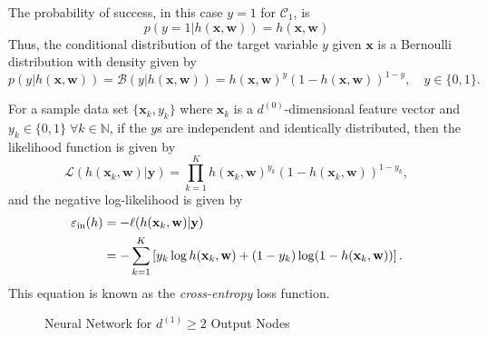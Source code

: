 The probability of success, in this case $y=1$ for $\mathcal{C}_1$, is 
$$
p(y=1|h(\mathbf{x},\mathbf{w}))=h(\mathbf{x},\mathbf{w})
$$
Thus, the conditional distribution of the target variable $y$ given $\mathbf{x}$ is a Bernoulli distribution with density given by
$$
p(y|h(\mathbf{x},\mathbf{w}))=\mathcal{B}(y|h(\mathbf{x},\mathbf{w}))=h(\mathbf{x},\mathbf{w})^{y}(1-h(\mathbf{x},\mathbf{w}))^{1-y},\quad y\in\{0,1\}.
$$

For a sample data set $\{\mathbf{x}_k,y_k\}$ where $\mathbf{x}_k$ is a $d^{(0)}$-dimensional feature vector and $y_k\in\{0,1\}\;\forall k\in\mathbb{N}$, if the $y$s are independent and identically distributed, then the likelihood function is given by
$$
\mathcal{L}(h(\mathbf{x}_k,\mathbf{w})|\mathbf{y})=\prod_{k=1}^{K}h(\mathbf{x}_k,\mathbf{w})^{y_k}(1-h(\mathbf{x}_k,\mathbf{w}))^{1-y_k},
$$
and the negative log-likelihood is given by 
\begin{align}
\varepsilon_{\mathrm{in}}(h)&=-\ell (h(\mathbf{x}_k,\mathbf{w})|\mathbf{y})\nonumber\\
&=-\sum_{k=1}^{K}\left[y_k\log h(\mathbf{x}_k,\mathbf{w})+(1-y_k)\log(1-h(\mathbf{x}_k,\mathbf{w}))\right].\label{eq:logitein}
\end{align}
This equation is known as the \textit{cross-entropy} loss function.
\begin{figure}[!t]
  \vspace{0.7cm}
\centering
{}
\centering{}
\vspace{0.7cm}
\caption[Neural Network for $d^{(1)}\geq 2$ Output Nodes]{Neural Network for $d^{(1)}\geq 2$ Output Nodes}
\label{fig:kloginn}
\end{figure}
